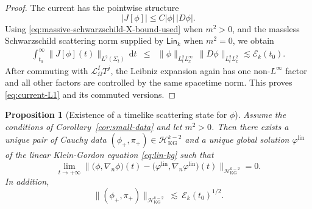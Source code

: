 \documentclass[11pt]{article}
\numberwithin{equation}{section}
\theoremstyle{plain}
\newtheorem{proposition}[theorem]{Proposition}
\theoremstyle{definition}
\theoremstyle{remark}
\newcommand{\dd}{\mathrm{d}}
\newcommand{\Lin}{\mathsf{Lin}}
\begin{document}
\begin{proof}
The current has the pointwise structure
\begin{equation}
 |J[\phi]|\le C|\phi|\,|D\phi|.
\end{equation}
Using \eqref{eq:massive-schwarzschild-X-bound-used} when \(m^2>0\), and the massless Schwarzschild scattering norm supplied by \(\Lin_k\) when \(m^2=0\), we obtain
\begin{eqnarray}
\int_{t_0}^{\infty}\|J[\phi](t)\|_{L^2(\Sigma_t)}\,\dd t
&\le&
\|\phi\|_{L^2_tL^\infty_x}\,\|D\phi\|_{L^2_tL^2_x}
\lesssim \mathcal E_k(t_0).
\end{eqnarray}
After commuting with \(\mathcal L_\Omega^I T^j\), the Leibniz expansion again has one non-\(L^\infty\) factor and all other factors are controlled by the same spacetime norm.  This proves \eqref{eq:current-L1} and its commuted versions.
\end{proof}

\begin{proposition}[Existence of a timelike scattering state for $\phi$]\label{prop:timelike-scattering}
Assume the conditions of Corollary~\ref{cor:small-data} and let $m^{2}>0$.
Then there exists a unique pair of Cauchy data $(\phi_{+},\pi_{+})\in \mathcal H_{\mathrm{KG}}^{k-2}$ and a unique global solution $\varphi^{\mathrm{lin}}$ of the linear Klein-Gordon equation \eqref{eq:lin-kg} such that
\begin{equation}\label{eq:timelike-scattering}
\lim_{t\to+\infty}
\bigl\|\bigl(\phi,\nabla_{n}\phi\bigr)(t)-\bigl(\varphi^{\mathrm{lin}},\nabla_{n}\varphi^{\mathrm{lin}}\bigr)(t)\bigr\|_{\mathcal H_{\mathrm{KG}}^{k-2}}
=0.
\end{equation}
In addition,
\begin{equation}\label{eq:timelike-state-bound}
\|(\phi_{+},\pi_{+})\|_{\mathcal H_{\mathrm{KG}}^{k-2}}\ \lesssim\ \mathcal E_k(t_0)^{1/2}.
\end{equation}
\end{proposition}
\end{document}
